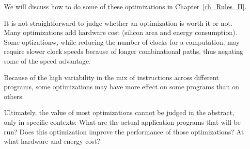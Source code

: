 We will discuss how to do some of these optimizations in
Chapter~\ref{ch_Rules_II}.

It is not straightforward to judge whether an optimization is worth it
or not.  Many optimizations add hardware cost (silicon area and energy
consumption).  Some optizationw, while reducing the number of clocks
for a computation, may require slower clock speeds because of longer
combinational paths, thus negating some of the speed advantage.

Because of the high variability in the mix of instructions across
different programs, some optimizations may have more effect on some
programs than on others.

Ultimately, the value of most optimizations cannot be judged in the
abstract, only in specific contexts: What are the actual application
programs that will be run? Does this optimization improve the
performance of those optimizations? At what hardware and energy cost?

